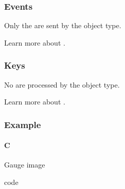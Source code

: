 \documentclass[letterpaper,10pt,english]{sphinxmanual}
\begin{document}
\subsubsection{Events}
\label{\detokenize{object-types/gauge:events}}
Only the  are sent by the object type.

Learn more about {\hyperref[\detokenize{overview/events::doc}]{}}.


\subsubsection{Keys}
\label{\detokenize{object-types/gauge:keys}}
No  are processed by the object type.

Learn more about {\hyperref[\detokenize{overview/indev::doc}]{}}.


\subsubsection{Example}
\label{\detokenize{object-types/gauge:example}}

\paragraph{C}
\label{\detokenize{object-types/gauge:c}}
Gauge image

code
\end{document}
